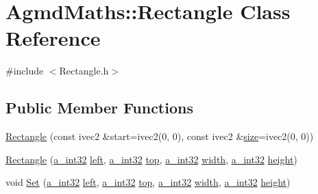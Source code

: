 \hypertarget{class_agmd_maths_1_1_rectangle}{\section{Agmd\+Maths\+:\+:Rectangle Class Reference}
\label{class_agmd_maths_1_1_rectangle}
}


{\ttfamily \#include $<$Rectangle.\+h$>$}

\subsection*{Public Member Functions}
\begin{DoxyCompactItemize}
\item 
\hyperlink{class_agmd_maths_1_1_rectangle_af26b7efa0f4eb5317cefd3a8945a68cd}{Rectangle} (const ivec2 \&start=ivec2(0, 0), const ivec2 \&\hyperlink{class_agmd_maths_1_1_rectangle_a370280fcbf5e0e41b19c81070d29b673}{size}=ivec2(0, 0))
\item 
\hyperlink{class_agmd_maths_1_1_rectangle_a93c591bf3a2cd1b9da1d13f13e221d78}{Rectangle} (\hyperlink{_common_defines_8h_ae2e4316e0b924774484a728669bebc9b}{a\+\_\+int32} \hyperlink{class_agmd_maths_1_1_rectangle_a5f7011fcba6e867de2b407e8818b7283}{left}, \hyperlink{_common_defines_8h_ae2e4316e0b924774484a728669bebc9b}{a\+\_\+int32} \hyperlink{class_agmd_maths_1_1_rectangle_a58a5c48cad84de8f8c1babd77f2b1500}{top}, \hyperlink{_common_defines_8h_ae2e4316e0b924774484a728669bebc9b}{a\+\_\+int32} \hyperlink{class_agmd_maths_1_1_rectangle_af1c815824174137249e8e73d2619a220}{width}, \hyperlink{_common_defines_8h_ae2e4316e0b924774484a728669bebc9b}{a\+\_\+int32} \hyperlink{class_agmd_maths_1_1_rectangle_a9dae0715e9e44bdbd86bc1d952862cd6}{height})
\item 
void \hyperlink{class_agmd_maths_1_1_rectangle_a4f2c17546d1b6c5ee4c8afd7f07eafe0}{Set} (\hyperlink{_common_defines_8h_ae2e4316e0b924774484a728669bebc9b}{a\+\_\+int32} \hyperlink{class_agmd_maths_1_1_rectangle_a5f7011fcba6e867de2b407e8818b7283}{left}, \hyperlink{_common_defines_8h_ae2e4316e0b924774484a728669bebc9b}{a\+\_\+int32} \hyperlink{class_agmd_maths_1_1_rectangle_a58a5c48cad84de8f8c1babd77f2b1500}{top}, \hyperlink{_common_defines_8h_ae2e4316e0b924774484a728669bebc9b}{a\+\_\+int32} \hyperlink{class_agmd_maths_1_1_rectangle_af1c815824174137249e8e73d2619a220}{width}, \hyperlink{_common_defines_8h_ae2e4316e0b924774484a728669bebc9b}{a\+\_\+int32} \hyperlink{class_agmd_maths_1_1_rectangle_a9dae0715e9e44bdbd86bc1d952862cd6}{height})

\end{DoxyCompactItemize}
